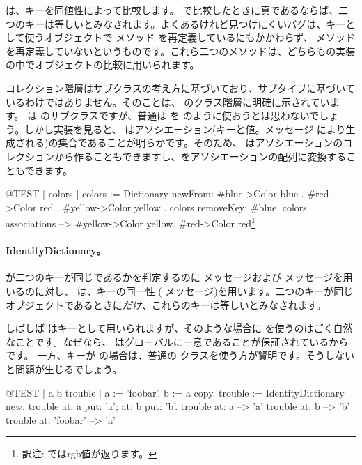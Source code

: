 \documentclass[a4paper,10pt,twoside]{book}
\begin{document}
は、キーを同値性によって比較します。 \ct{=} で比較したときに真であるならば、二つのキーは等しいとみなされます。よくあるけれど見つけにくいバグは、キーとして使うオブジェクトで \ct{=}メソッド を再定義しているにもかかわらず、 メソッドを再定義していないというものです。これら二つのメソッドは、どちらもの実装の中でオブジェクトの比較に用いられます。

コレクション階層はサブクラスの考え方に基づいており、サブタイプに基づいているわけではありません。そのことは、 のクラス階層に明確に示されています。 は  のサブクラスですが、普通は  を  のように使おうとは思わないでしょう。しかし実装を見ると、 はアソシエーション(キーと値。メッセージ  により生成される)の集合であることが明らかです。そのため、 はアソシエーションのコレクションから作ることもできますし、をアソシエーションの配列に変換することもできます。

\begin{code}{@TEST | colors |}
colors := Dictionary newFrom: { #blue->Color blue . #red->Color red . #yellow->Color yellow }.
colors removeKey: #blue.
colors associations --> {#yellow->Color yellow. #red->Color red}\footnote{訳注:  ではrgb値が返ります。}
\end{code}

\paragraph{IdentityDictionary。}
 が二つのキーが同じであるかを判定するのに \ct{=} メッセージおよび  メッセージを用いるのに対し、 は、キーの同一性 ( メッセージ)を用います。\ie 二つのキーが同じオブジェクトであるときに\emph{だけ}、これらのキーは等しいとみなされます。

しばしば  はキーとして用いられますが、そのような場合に を使うのはごく自然なことです。なぜなら、 はグローバルに一意であることが保証されているからです。
一方、キーが  の場合は、普通の  クラスを使う方が賢明です。そうしないと問題が生じるでしょう。

\begin{code}{@TEST | a b trouble |}
a := 'foobar'.
b := a copy.
trouble := IdentityDictionary new.
trouble at: a put: 'a'; at: b put: 'b'.
trouble at: a          --> 'a'
trouble at: b          --> 'b'
trouble at: 'foobar' --> 'a'
\end{code}
\end{document}
